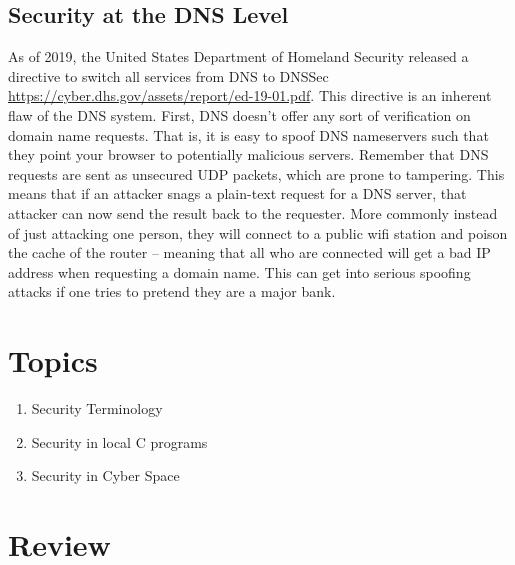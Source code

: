 \subsection{Security at the DNS Level}

As of 2019, the United States Department of Homeland Security released a directive to switch all services from DNS to DNSSec \url{https://cyber.dhs.gov/assets/report/ed-19-01.pdf}.
This directive is an inherent flaw of the DNS system.
First, DNS doesn't offer any sort of verification on domain name requests.
That is, it is easy to spoof DNS nameservers such that they point your browser to potentially malicious servers.
Remember that DNS requests are sent as unsecured UDP packets, which are prone to tampering. This means that if an attacker snags a plain-text request for a DNS server, that attacker can now send the result back to the requester.
More commonly instead of just attacking one person, they will connect to a public wifi station and poison the cache of the router -- meaning that all who are connected will get a bad IP address when requesting a domain name.
This can get into serious spoofing attacks if one tries to pretend they are a major bank.

\section{Topics}

\begin{enumerate}
\item Security Terminology
\item Security in local C programs
\item Security in Cyber Space
\end{enumerate}

\section{Review}

